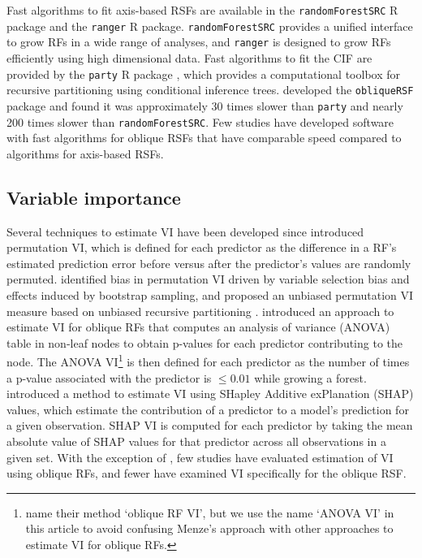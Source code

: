 \documentclass{article}\usepackage[]{graphicx}\usepackage[]{xcolor}
\begin{document}
Fast algorithms to fit axis-based RSFs are available in the \texttt{randomForestSRC} R package \citep{randomForestSRC} and the \texttt{ranger} \citep{ranger} R package. \texttt{randomForestSRC} provides a unified interface to grow RFs in a wide range of analyses, and \texttt{ranger} is designed to grow RFs efficiently using high dimensional data. Fast algorithms to fit the CIF are provided by the \texttt{party} R package \citep{hothorn2010party}, which provides a computational toolbox for recursive partitioning using conditional inference trees. \citet{jaeger2019oblique} developed the \texttt{obliqueRSF} package and found it was approximately 30 times slower than \texttt{party} and nearly 200 times slower than \texttt{randomForestSRC}. Few studies have developed software with fast algorithms for oblique RSFs that have comparable speed compared to algorithms for axis-based RSFs.

\subsection{Variable importance} \label{sec:rw_vi}

Several techniques to estimate VI have been developed since \citet{breiman2001random} introduced permutation VI, which is defined for each predictor as the difference in a RF's estimated prediction error before versus after the predictor's values are randomly permuted. \citet{strobl2007bias} identified bias in permutation VI driven by variable selection bias and effects induced by bootstrap sampling, and proposed an unbiased permutation VI measure based on unbiased recursive partitioning \citep{hothorn2006unbiased}. \citet{menze2011oblique} introduced an approach to estimate VI for oblique RFs that computes an analysis of variance (ANOVA) table in non-leaf nodes to obtain p-values for each predictor contributing to the node. The ANOVA VI\footnote{\citet{menze2011oblique} name their method `oblique RF VI', but we use the name `ANOVA VI' in this article to avoid confusing Menze's approach with other approaches to estimate VI for oblique RFs.} is then defined for each predictor as the number of times a p-value associated with the predictor is $\leq 0.01$ while growing a forest. \citet{lundberg2017unified} introduced a method to estimate VI using SHapley Additive exPlanation (SHAP) values, which estimate the contribution of a predictor to a model's prediction for a given observation. SHAP VI is computed for each predictor by taking the mean absolute value of SHAP values for that predictor across all observations in a given set. With the exception of \citet{menze2011oblique}, few studies have evaluated estimation of VI using oblique RFs, and fewer have examined VI specifically for the oblique RSF.
\end{document}
